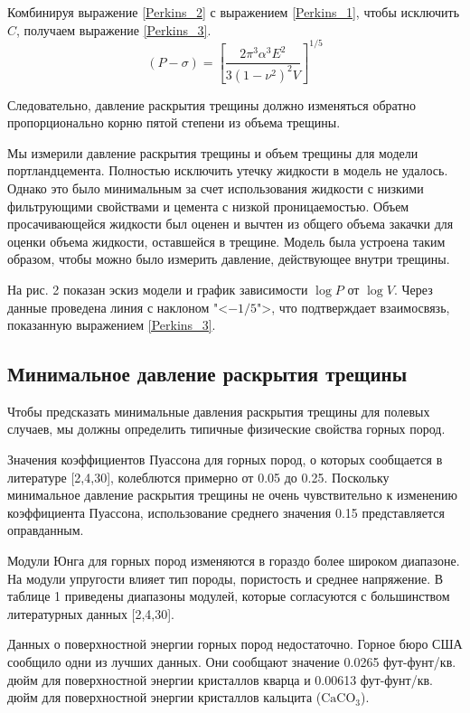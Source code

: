\documentclass[a4paper, 12pt]{article}
\newcommand{\beq}{\begin{equation}}
\newcommand{\eeq}{\end{equation}}
\begin{document}
Комбинируя выражение \eqref{Perkins_2} с выражением \eqref{Perkins_1}, чтобы исключить $C$, получаем выражение \eqref{Perkins_3}.
\beq\label{Perkins_3}
\left(P-\sigma\right)=\left[\frac{2\pi^3\alpha^3E^2}{3\left(1-\nu^2\right)^2V}\right]^{1/5}
\tag{3}
\eeq

Следовательно, давление раскрытия трещины должно изменяться обратно пропорционально корню пятой степени из объема трещины.

Мы измерили давление раскрытия трещины и объем трещины для модели портландцемента.
Полностью исключить утечку жидкости в модель не удалось.
Однако это было минимальным за счет использования жидкости с низкими фильтрующими свойствами и цемента с низкой проницаемостью.
Объем просачивающейся жидкости был оценен и вычтен из общего объема закачки для оценки объема жидкости, оставшейся в трещине.
Модель была устроена таким образом, чтобы можно было измерить давление, действующее внутри трещины.

На рис. 2 показан эскиз модели и график зависимости $\log P$ от $\log V$.
Через данные проведена линия с наклоном "<$-1/5$">, что подтверждает взаимосвязь, показанную выражением \eqref{Perkins_3}.

\subsection{Минимальное давление раскрытия трещины}

Чтобы предсказать минимальные давления раскрытия трещины для полевых случаев, мы должны определить типичные физические свойства горных пород.

Значения коэффициентов Пуассона для горных пород, о которых сообщается в литературе [2,4,30], колеблются примерно от 0.05 до 0.25.
Поскольку минимальное давление раскрытия трещины не очень чувствительно к изменению коэффициента Пуассона, использование среднего значения 0.15 представляется оправданным.

Модули Юнга для горных пород изменяются в гораздо более широком диапазоне.
На модули упругости влияет тип породы, пористость и среднее напряжение.
В таблице 1 приведены диапазоны модулей, которые согласуются с большинством литературных данных [2,4,30].

Данных о поверхностной энергии горных пород недостаточно.
Горное бюро США сообщило одни из лучших данных.
Они сообщают значение 0.0265 фут-фунт/кв. дюйм для поверхностной энергии кристаллов кварца и 0.00613 фут-фунт/кв. дюйм для поверхностной энергии кристаллов кальцита ($\text{CaCO}_3$).
\end{document}
